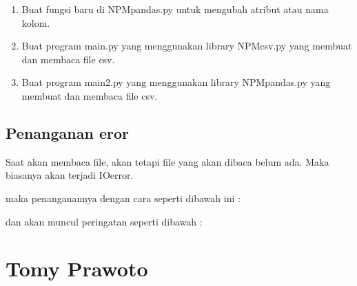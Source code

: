 \begin{enumerate}
	
	
	\item Buat fungsi baru di NPMpandas.py untuk mengubah atribut atau nama kolom.
	
	
	
	\item Buat program main.py yang menggunakan library NPMcsv.py yang membuat dan membaca file csv.
	
	
	
	\item Buat program main2.py yang menggunakan library NPMpandas.py yang membuat dan membaca file csv.
	
		
\end{enumerate}

\subsection{Penanganan eror}
Saat akan membaca file, akan tetapi file yang akan dibaca belum ada. Maka biasanya akan terjadi IOerror.

maka penanganannya dengan cara seperti dibawah ini :

dan akan muncul peringatan seperti dibawah :


\section{Tomy Prawoto}
